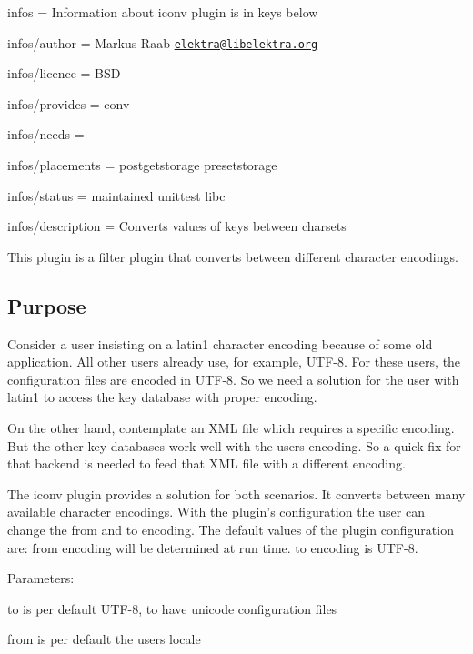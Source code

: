 
\begin{DoxyItemize}
\item infos = Information about iconv plugin is in keys below
\item infos/author = Markus Raab \href{mailto:elektra@libelektra.org}{\tt elektra@libelektra.\+org}
\item infos/licence = B\+S\+D
\item infos/provides = conv
\item infos/needs =
\item infos/placements = postgetstorage presetstorage
\item infos/status = maintained unittest libc
\item infos/description = Converts values of keys between charsets
\end{DoxyItemize}

This plugin is a filter plugin that converts between different character encodings.

\subsection*{Purpose}

Consider a user insisting on a {\ttfamily latin1} character encoding because of some old application. All other users already use, for example, {\ttfamily U\+T\+F-\/8}. For these users, the configuration files are encoded in {\ttfamily U\+T\+F-\/8}. So we need a solution for the user with {\ttfamily latin1} to access the key database with proper encoding.

On the other hand, contemplate an X\+M\+L file which requires a specific encoding. But the other key databases work well with the users encoding. So a quick fix for that backend is needed to feed that X\+M\+L file with a different encoding.

The iconv plugin provides a solution for both scenarios. It converts between many available character encodings. With the plugin’s configuration the user can change the from and to encoding. The default values of the plugin configuration are\+: {\ttfamily from} encoding will be determined at run time. {\ttfamily to} encoding is {\ttfamily U\+T\+F-\/8}.

Parameters\+:
\begin{DoxyItemize}
\item {\ttfamily to} is per default U\+T\+F-\/8, to have unicode configuration files
\item {\ttfamily from} is per default the users locale
\end{DoxyItemize}

